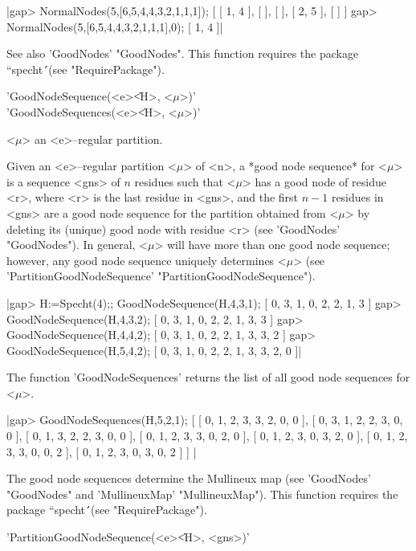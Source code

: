 |gap> NormalNodes(5,[6,5,4,4,3,2,1,1,1]);
[ [ 1, 4 ], [  ], [  ], [ 2, 5 ], [  ] ]
gap> NormalNodes(5,[6,5,4,4,3,2,1,1,1],0);
[ 1, 4 ]|

See also 'GoodNodes' "GoodNodes". This function requires the package 
``specht\'\'\ (see "RequirePackage").




'GoodNodeSequence(<e>\|<H>, <$\mu$>)'\\
'GoodNodeSequences(<e>\|<H>, <$\mu$>)'

<$\mu$> an <e>--regular partition.

Given an <e>--regular partition <$\mu$> of <n>, a *good node sequence* for 
<$\mu$> is a sequence <gns> of $n$ residues such that <$\mu$> has a good 
node of residue <r>, where <r> is the last residue in <gns>, and the first 
$n-1$ residues in <gns> are a good node sequence for the partition
obtained from <$\mu$> by deleting its (unique) good node with residue <r>
(see 'GoodNodes' "GoodNodes"). In general, <$\mu$> will have more than one
good node sequence; however, any good node sequence uniquely determines
<$\mu$> (see 'PartitionGoodNodeSequence' "PartitionGoodNodeSequence").

|gap> H:=Specht(4);; GoodNodeSequence(H,4,3,1);
[ 0, 3, 1, 0, 2, 2, 1, 3 ]
gap> GoodNodeSequence(H,4,3,2);
[ 0, 3, 1, 0, 2, 2, 1, 3, 3 ]
gap> GoodNodeSequence(H,4,4,2);  
[ 0, 3, 1, 0, 2, 2, 1, 3, 3, 2 ]
gap> GoodNodeSequence(H,5,4,2);
[ 0, 3, 1, 0, 2, 2, 1, 3, 3, 2, 0 ]|

The function 'GoodNodeSequences' returns the list of all good node 
sequences for <$\mu$>.

|gap> GoodNodeSequences(H,5,2,1);
[ [ 0, 1, 2, 3, 3, 2, 0, 0 ], [ 0, 3, 1, 2, 2, 3, 0, 0 ], 
  [ 0, 1, 3, 2, 2, 3, 0, 0 ], [ 0, 1, 2, 3, 3, 0, 2, 0 ], 
  [ 0, 1, 2, 3, 0, 3, 2, 0 ], [ 0, 1, 2, 3, 3, 0, 0, 2 ], 
  [ 0, 1, 2, 3, 0, 3, 0, 2 ] ] |

The good node sequences determine the Mullineux map (see 'GoodNodes'
"GoodNodes" and 'MullineuxMap' "MullineuxMap"). This function requires the 
package ``specht\'\'\ (see "RequirePackage").



'PartitionGoodNodeSequence(<e>\|<H>, <gns>)'

